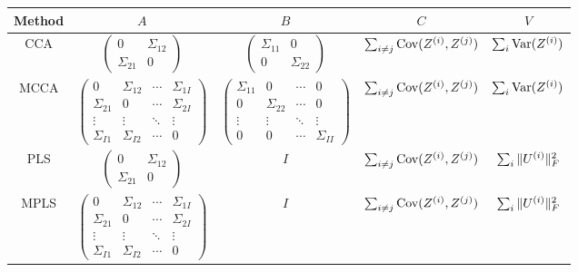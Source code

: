 \begin{table}[h]
    \centering
    \small %
    \begin{tabular}{|c|c|c|c|c|}
    \hline
    Method & $A$ & $B$ & $C$ & $V$ \\
    \hline
    CCA & $\begin{pmatrix} 
    0 & \Sigma_{12} \\
    \Sigma_{21} & 0
    \end{pmatrix}$ & $\begin{pmatrix}
    \Sigma_{11} & 0 \\
    0 & \Sigma_{22}
    \end{pmatrix}$ & $\sum_{i \neq j} \mathrm{Cov}(Z^{(i)}, Z^{(j)})$ & $\sum_{i} \mathrm{Var}(Z^{(i)})$ \\
    \hline
    MCCA & $\begin{pmatrix}
    0 & \Sigma_{12} & \cdots & \Sigma_{1I} \\
    \Sigma_{21} & 0 & \cdots & \Sigma_{2I} \\
    \vdots & \vdots & \ddots & \vdots \\
    \Sigma_{I1} & \Sigma_{I2} & \cdots & 0
    \end{pmatrix}$ & $\begin{pmatrix}
    \Sigma_{11} & 0 & \cdots & 0 \\
    0 & \Sigma_{22} & \cdots & 0 \\
    \vdots & \vdots & \ddots & \vdots \\
    0 & 0 & \cdots & \Sigma_{II}
    \end{pmatrix}$ & $\sum_{i \neq j} \mathrm{Cov}(Z^{(i)}, Z^{(j)})$ & $\sum_{i} \mathrm{Var}(Z^{(i)})$ \\
    \hline
    PLS & $\begin{pmatrix}
    0 & \Sigma_{12} \\
    \Sigma_{21} & 0
    \end{pmatrix}$ & $I$ & $\sum_{i \neq j} \mathrm{Cov}(Z^{(i)}, Z^{(j)})$ & $\sum_{i} \|U^{(i)}\|_F^2$ \\
    \hline
    MPLS & $\begin{pmatrix}
    0 & \Sigma_{12} & \cdots & \Sigma_{1I} \\
    \Sigma_{21} & 0 & \cdots & \Sigma_{2I} \\
    \vdots & \vdots & \ddots & \vdots \\
    \Sigma_{I1} & \Sigma_{I2} & \cdots & 0
    \end{pmatrix}$ & $I$ & $\sum_{i \neq j} \mathrm{Cov}(Z^{(i)}, Z^{(j)})$ & $\sum_{i} \|U^{(i)}\|_F^2$ \\

\end{tabular}
\end{table}
